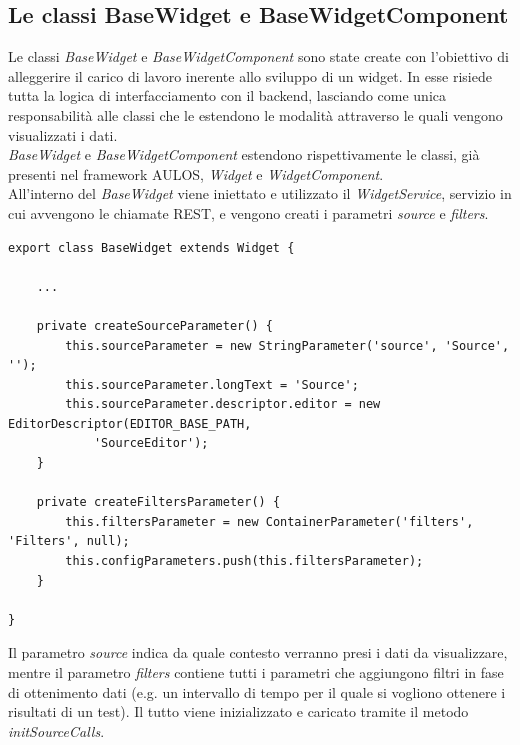 \subsection{Le classi BaseWidget e BaseWidgetComponent}
\label{subsec:base}
Le classi \textit{BaseWidget} e \textit{BaseWidgetComponent} sono state create con l'obiettivo di alleggerire il carico di lavoro inerente allo sviluppo di un widget. In esse risiede tutta la logica di interfacciamento con il backend, lasciando come unica responsabilità alle classi che le estendono le modalità attraverso le quali vengono visualizzati i dati.
\\
\textit{BaseWidget} e \textit{BaseWidgetComponent} estendono rispettivamente le classi, già presenti nel framework AULOS, \textit{Widget} e \textit{WidgetComponent}.
\\
All'interno del \textit{BaseWidget} viene iniettato e utilizzato il \textit{WidgetService}, servizio in cui avvengono le chiamate REST, e vengono creati i parametri \textit{source} e \textit{filters}. 

\begin{lstlisting}[caption={Classe BaseWidget, creazione dei parametri}, style=javaScriptCode]
export class BaseWidget extends Widget {

    ...

    private createSourceParameter() {
        this.sourceParameter = new StringParameter('source', 'Source', '');
        this.sourceParameter.longText = 'Source';
        this.sourceParameter.descriptor.editor = new EditorDescriptor(EDITOR_BASE_PATH,
            'SourceEditor');
    }

    private createFiltersParameter() {
        this.filtersParameter = new ContainerParameter('filters', 'Filters', null);
        this.configParameters.push(this.filtersParameter);
    }

}
\end{lstlisting}

Il parametro \textit{source} indica da quale contesto verranno presi i dati da visualizzare, mentre il parametro \textit{filters} contiene tutti i parametri che aggiungono filtri in fase di ottenimento dati (e.g. un intervallo di tempo per il quale si vogliono ottenere i risultati di un test). Il tutto viene inizializzato e caricato tramite il metodo \textit{initSourceCalls}.

